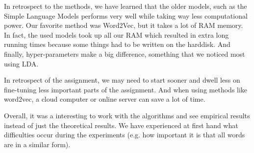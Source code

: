 In retrospect to the methods, we have learned that the older models, such as the Simple Language Models performs very well while taking way less computational power. Our favorite method was Word2Vec, but it takes a lot of RAM memory. In fact, the used models took up all our RAM which resulted in extra long running times because some things had to be written on the harddisk.
And finally, hyper-parameters make a big difference, something that we noticed most using LDA.

In retrospect of the assignment, we may need to start sooner and dwell less on fine-tuning less important parts of the assignment. And when using methods like word2vec, a cloud computer or online server can save a lot of time.

Overall, it was a interesting to work with the algorithms and see empirical results instead of just the theoretical results. We have experienced at first hand what difficulties occur during the experiments (e.g. how important it is that all words are in a similar form).